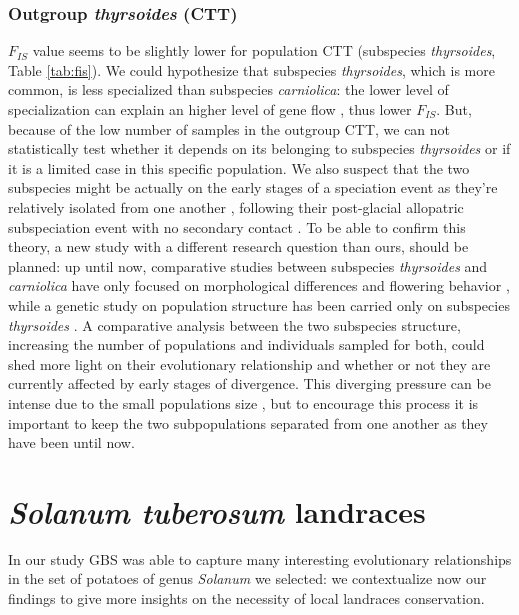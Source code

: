 \documentclass[a4paper, 12pt]{report}
\begin{document}
\subsubsection{Outgroup \textit{thyrsoides} (CTT)}
$F_{IS}$ value seems to be slightly lower for population CTT (subspecies \textit{thyrsoides}, Table \ref{tab:fis}). We could hypothesize that subspecies \textit{thyrsoides}, which is more common, is less specialized than subspecies \textit{carniolica}: the lower level of specialization can explain an higher level of gene flow \parencite{habelBurdenGeneticDiversity2012}, thus lower $F_{IS}$. But, because of the low number of samples in the outgroup CTT, we can not statistically test whether it depends on its belonging to subspecies \textit{thyrsoides} or if it is a limited case in this specific population. We also suspect that the two subspecies might be actually on the early stages of a speciation event as they're relatively isolated from one another \parencite{hughesStrongGeneticStructuring1999}, following their post-glacial allopatric subspeciation event with no secondary contact \parencite{kussSpatialGeneticStructure2011}. To be able to confirm this theory, a new study with a different research question than ours, should be planned: up until now, comparative studies between subspecies \textit{thyrsoides} and \textit{carniolica} have only focused on morphological differences \parencite{scheepensDifferentiationMorphologyFlowering2011} and flowering behavior \parencite{kussSpatialGeneticStructure2011}, while a genetic study on population structure has been carried only on subspecies \textit{thyrsoides} \parencite{aegisdottirIsolatedPopulationsRare2009}. A comparative analysis between the two subspecies structure, increasing the number of populations and individuals sampled for both, could shed more light on their evolutionary relationship and whether or not they are currently affected by early stages of divergence. This diverging pressure can be intense due to the small populations size \parencite{hughesStrongGeneticStructuring1999}, but to encourage this process it is important to keep the two subpopulations separated from one another as they have been until now.

\clearpage
\section{{\textit{Solanum tuberosum} landraces}}
In our study GBS was able to capture many interesting evolutionary relationships in the set of potatoes of genus \textit{Solanum} we selected: we contextualize now our findings to give more insights on the necessity of local landraces conservation. 
\end{document}
